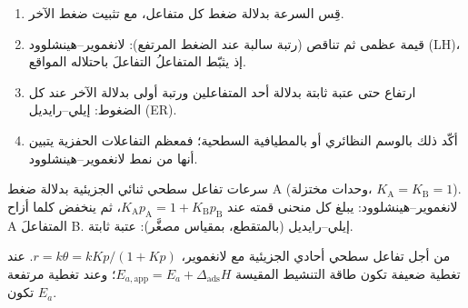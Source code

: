 \begin{method}\label{met:b3:surfaces-catalysis:mechanism-from-rate}
\begin{enumerate}
  \item قِس السرعة بدلالة ضغط كل متفاعل، مع تثبيت ضغط
        الآخر.
  \item قيمة عظمى ثم تناقص (رتبة سالبة عند الضغط المرتفع):
        لانغموير--هينشلوود (LH)، إذ يثبّط المتفاعلُ التفاعلَ باحتلاله المواقع.
  \item ارتفاع حتى عتبة ثابتة بدلالة أحد المتفاعلين ورتبة أولى بدلالة الآخر عند كل
        الضغوط: إيلي--رايديل (ER).
  \item أكّد ذلك بالوسم النظائري أو بالمطيافية السطحية؛ فمعظم التفاعلات
        الحفزية يتبين أنها من نمط لانغموير--هينشلوود.
\end{enumerate}
\end{method}

\begin{omfigure}

{\small سرعات تفاعل سطحي ثنائي الجزيئية بدلالة ضغط A
(وحدات مختزلة، $K_{\mathrm A} = K_{\mathrm B} = 1$). لانغموير--هينشلوود: يبلغ كل منحنى قمته عند $K_{\mathrm A}p_{\mathrm A} =
1 + K_{\mathrm B}p_{\mathrm B}$، ثم ينخفض كلما أزاح A المتفاعلَ B. إيلي--رايديل (بالمتقطع، بمقياس مصغَّر): عتبة ثابتة.}
\end{omfigure}

\begin{proposition}\label{prop:b3:surfaces-catalysis:apparent-ea}
من أجل تفاعل سطحي أحادي الجزيئية مع  لانغموير، $r = k\theta = kKp/(1 + Kp)$.
عند تغطية ضعيفة تكون طاقة التنشيط المقيسة $E_{a,\mathrm{app}} = E_a + \Delta_{\mathrm{ads}}H$؛ وعند
تغطية مرتفعة تكون $E_a$.
\end{proposition}

